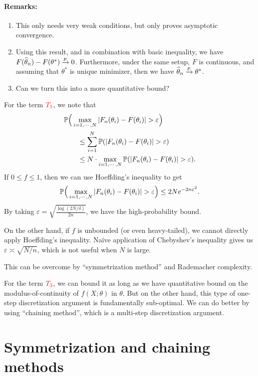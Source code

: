 \documentclass[11pt,letterpaper]{article}
\numberwithin{theorem}{lecture}
\numberwithin{proposition}{lecture}
\numberwithin{lemma}{lecture}
\numberwithin{claim}{lecture}
\numberwithin{corollary}{lecture}
\numberwithin{definition}{lecture}
\numberwithin{conjecture}{lecture}
\numberwithin{remark}{lecture}
\numberwithin{example}{lecture}
\numberwithin{equation}{lecture}
\begin{document}
\paragraph{Remarks:}
\begin{enumerate}
  \item This only needs very weak conditions, but only proves asymptotic convergence.
  \item Using this result, and in combination with basic inequality, we have $F(\widehat{\theta}_n) - F (\theta^*) \xrightarrow{p} 0$. Furthermore, under the same setup, $F$ is continuous, and assuming that $\theta^*$ is unique minimizer, then we have $\widehat{\theta}_n \xrightarrow{p} \theta^*$.
  \item Can we turn this into a more quantitative bound?
\end{enumerate}
For the term $\color{red} T_1$, we note that
\begin{align*}
  &{\mathbb{P}} \Big( \max_{i = 1, \cdots, N} |F_n (\theta_i) - F (\theta_i)| > \varepsilon \Big)\\
  &\qquad\leq \sum_{i = 1}^N {\mathbb{P}} (|F_n (\theta_i) - F (\theta_i)| > \varepsilon)\\
  &\qquad\leq N \cdot \max_{i = 1, \cdots, N} {\mathbb{P}} (|F_n (\theta_i) - F (\theta_i)| > \varepsilon).
\end{align*}
If $0\leq f\leq1$, then we can use Hoeffding's inequality to get
\begin{align*}
  {\mathbb{P}} \Big( \max_{i = 1, \cdots, N} |F_n (\theta_i) - F (\theta_i)| > \varepsilon \Big) \leq 2N e^{-2n\varepsilon^2}.
\end{align*}
By taking $\varepsilon = \sqrt{\frac{\log (2N / \delta)}{2n}}$,  we have the high-probability bound.

On the other hand, if $f$ is unbounded (or even heavy-tailed), we cannot directly apply Hoeffding's inequality. Na\"{i}ve application of Chebyshev's inequality gives us $\varepsilon \asymp \sqrt{N / n}$, which is not useful when $N$ is large.

This can be overcome by ``symmetrization method'' and Rademacher complexity.

\bigskip
For the term $\color{red} T_3$, we can bound it as long as we have quantitative bound on the modulus-of-continuity of $f (X; \theta)$ in $\theta$. But on the other hand, this type of one-step discretization argument is fundamentally sub-optimal. We can do better by using ``chaining method'', which is a multi-step discretization argument.

\section{Symmetrization and chaining methods}
\end{document}
